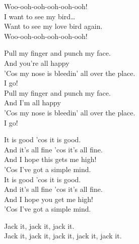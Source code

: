 Woo-ooh-ooh-ooh-ooh-ooh! \\

I want to see my  bird… \\
Want to see my love bird again. \\

Woo-ooh-ooh-ooh-ooh-ooh! \\




Pull my finger and punch my face. \\
And you're all happy \\
'Cos my nose is bleedin' all over the place. \\
I go! \\

Pull my finger and punch my face. \\
And I'm all happy \\
'Cos my nose is bleedin' all over the place. \\
I go! \\




It is good 'cos it is good. \\
And it's all fine 'cos it's all fine. \\
And I hope this gets me high! \\
'Cos I've got a simple mind. \\

It is good 'cos it is good. \\
And it's all fine 'cos it's all fine. \\
And I hope you get me high! \\
'Cos I've got a simple mind. \\




Jack it, jack it, jack it. \\
Jack it, jack it, jack it, jack it, jack it. \\


